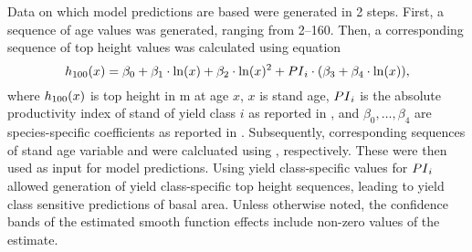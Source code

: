 Data on which model predictions are based were generated in 2 steps. First, a sequence of age values was generated, ranging from \SIrange{2}{160}{\year}.  Then, a corresponding sequence of top height values was calculated using equation
\begin{equation}
  \label{eq:NagelFunctionSolvedForTopHeight}
  h_{100}{}(x) = \beta_0 + \beta_1 \cdot \ln(x) + \beta_2 \cdot \ln(x)^2 + PI{}_i \cdot (\beta_3 + \beta_4 \cdot \ln(x)),
\end{equation}
where \(h_{100}{}(x)\) is top height in \si{\meter} at age \(x\), \(x\) is stand age, \(PI{}_i\) is the absolute productivity index of stand of yield class \(i\) as reported in , and \(\beta_0, \ldots, \beta_4\) are species-specific coefficients as reported in  \parencite{Nagel1999}.  Subsequently, corresponding sequences of stand age variable and \ProductivityIndexVariableText{} were calcluated using , respectively.  These were then used as input for model predictions.  Using yield class-specific values for \(PI{}_i\) allowed generation of yield class-specific top height sequences, leading to yield class sensitive predictions of basal area.  Unless otherwise noted, the confidence bands of the estimated smooth function effects include non-zero values of the estimate.

